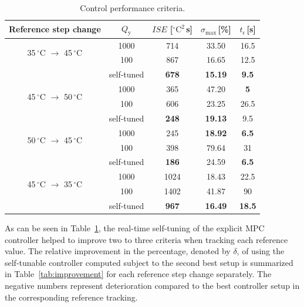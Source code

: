 \documentclass[preprint,12pt]{elsarticle}
\begin{document}
\begin{table}[h!]
	\begin{center}
		\caption{Control performance criteria.}
		\label{tab:control_performance}
		\begin{tabular}{c|c|c|c|c} 
			Reference step change & $Q_\mathrm{y}$ & $ISE$ [$^{\circ}\mathrm{C}^2$\,s] & $\sigma_{\mathrm{max}}$\,[\%] & $t_{\epsilon}$\,[s]  \\
			\hline
			\multirow{2}{*}{ 35\,$^{\circ}$C $\rightarrow$ 45\,$^{\circ}$C } & 1000 & 714 & 33.50 & 16.5 \\
			& 100 & 867 & 16.65 & 12.5 \\ 
			& self-tuned & \textbf{678} & \textbf{15.19} & \textbf{9.5}  \\ 
			\hline
			\multirow{2}{*}{ 45\,$^{\circ}$C $\rightarrow$ 50\,$^{\circ}$C } & 1000 & 365 & 47.20 & \textbf{5} \\
			& 100 & 606 & 23.25 & 26.5  \\ 
			& self-tuned & \textbf{248} & \textbf{19.13} & 9.5  \\ 
			\hline
			\multirow{2}{*}{ 50\,$^{\circ}$C $\rightarrow$ 45\,$^{\circ}$C } & 1000 & 245 & \textbf{18.92} & \textbf{6.5}  \\
			& 100 & 398 & 79.64 & 31  \\ 
			& self-tuned & \textbf{186} & 24.59 & \textbf{6.5}  \\ 
			\hline
			\multirow{2}{*}{ 45\,$^{\circ}$C $\rightarrow$ 35\,$^{\circ}$C } & 1000 & 1024 & 18.43 & 22.5  \\
			& 100 & 1402 & 41.87 & 90  \\ 
			& self-tuned & \textbf{967} & \textbf{16.49} & \textbf{18.5}   
		\end{tabular}
	\end{center}
\end{table}

As can be seen in Table~\ref{tab:control_performance}, the real-time self-tuning of the explicit MPC controller helped to improve two to three criteria when tracking each reference value. 	
The relative improvement in the percentage, denoted by $\delta$, of using the self-tunable controller computed subject to the second best setup is summarized in Table~\ref{tab:improvement} for each reference step change separately. The negative numbers represent deterioration compared to the best controller setup in the corresponding reference tracking. 
\end{document}
